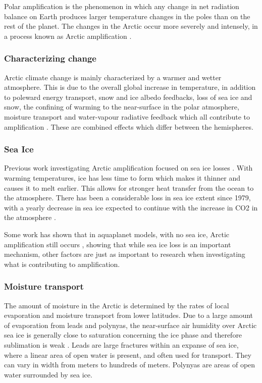 \documentclass[11pt, oneside]{article}
\begin{document}
{\color{blue}{Note that this structure is taken from my committee meeting document - Oct 2022 }}

Polar amplification is the phenomenon in which any change in net radiation balance on Earth produces larger temperature changes in the poles than on the rest of the planet. The changes in the Arctic occur more severely and intensely, in a process known as Arctic amplification \cite{england2021recent}.

\subsubsection{Characterizing change}
Arctic climate change is mainly characterized by a warmer and wetter atmosphere. This is due to the overall global increase in temperature, in addition to poleward energy transport, snow and ice albedo feedbacks, loss of sea ice and snow, the confining of warming to the near-surface in the polar atmosphere, moisture transport and water-vapour radiative feedback which all contribute to amplification \cite{serreze2011processes}. These are combined effects which differ between the hemispheres.

\subsubsection{Sea Ice}
Previous work investigating Arctic amplification focused on sea ice losses \cite{serreze2009emergence}. With warming temperatures, ice has less time to form which makes it thinner and causes it to melt earlier. This allows for stronger heat transfer from the ocean to the atmosphere. There has been a considerable loss in sea ice extent since 1979, with a yearly decrease in sea ice expected to continue with the increase in CO2 in the atmosphere \cite{dai2019arctic}. 

Some work has shown that in aquaplanet models, with no sea ice, Arctic amplification still occurs \cite{russotto2020polar}, showing that while sea ice loss is an important mechanism, other factors are just as important to research when investigating what is contributing to amplification. 

\subsubsection{Moisture transport}
The amount of moisture in the Arctic is determined by the rates of local evaporation and moisture transport from lower latitudes. Due to a large amount of evaporation from leads and polynyas, the near-surface air humidity over Arctic sea ice is generally close to saturation concerning the ice phase and therefore sublimation is weak \cite{andreas2002near}. Leads are large fractures within an expanse of sea ice, where a linear area of open water is present, and often used for transport. They can vary in width from meters to hundreds of meters. Polynyas are areas of open water surrounded by sea ice.
\end{document}
